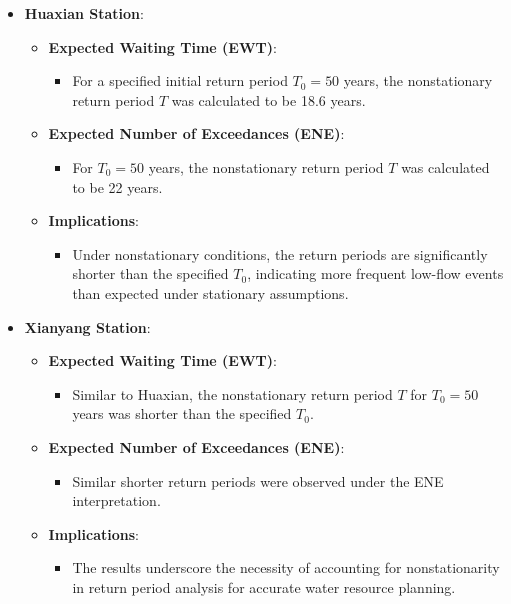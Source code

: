 \documentclass[
]{krantz}
\providecommand{\tightlist}{%
  \setlength{\itemsep}{0pt}\setlength{\parskip}{0pt}}
\begin{document}
\begin{itemize}
\tightlist
\item
  \textbf{Huaxian Station}:

  \begin{itemize}
  \tightlist
  \item
    \textbf{Expected Waiting Time (EWT)}:

    \begin{itemize}
    \tightlist
    \item
      For a specified initial return period \(T_0 = 50\) years, the nonstationary return period \(T\) was calculated to be 18.6 years.
    \end{itemize}
  \item
    \textbf{Expected Number of Exceedances (ENE)}:

    \begin{itemize}
    \tightlist
    \item
      For \(T_0 = 50\) years, the nonstationary return period \(T\) was calculated to be 22 years.
    \end{itemize}
  \item
    \textbf{Implications}:

    \begin{itemize}
    \tightlist
    \item
      Under nonstationary conditions, the return periods are significantly shorter than the specified \(T_0\), indicating more frequent low-flow events than expected under stationary assumptions.
    \end{itemize}
  \end{itemize}
\item
  \textbf{Xianyang Station}:

  \begin{itemize}
  \tightlist
  \item
    \textbf{Expected Waiting Time (EWT)}:

    \begin{itemize}
    \tightlist
    \item
      Similar to Huaxian, the nonstationary return period \(T\) for \(T_0 = 50\) years was shorter than the specified \(T_0\).
    \end{itemize}
  \item
    \textbf{Expected Number of Exceedances (ENE)}:

    \begin{itemize}
    \tightlist
    \item
      Similar shorter return periods were observed under the ENE interpretation.
    \end{itemize}
  \item
    \textbf{Implications}:

    \begin{itemize}
    \tightlist
    \item
      The results underscore the necessity of accounting for nonstationarity in return period analysis for accurate water resource planning.
    \end{itemize}
  \end{itemize}
\end{itemize}
\end{document}

